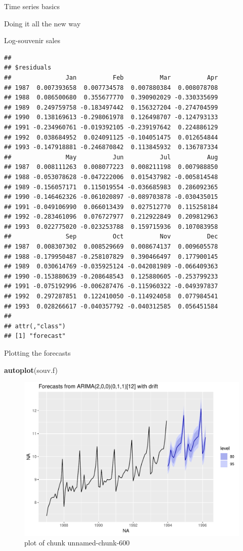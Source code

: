 \documentclass[ignorenonframetext,]{beamer}
\newenvironment{Shaded}{\begin{snugshade}}{\end{snugshade}}
\newcommand{\KeywordTok}[1]{\textcolor[rgb]{0.13,0.29,0.53}{\textbf{#1}}}
\newcommand{\NormalTok}[1]{#1}
\begin{document}
\begin{frame}[fragile]{Time series basics}
\begin{block}{Doing it all the new way}
\begin{block}{Log-souvenir sales}
\begin{verbatim}
## 
## $residuals
##               Jan          Feb          Mar          Apr
## 1987  0.007393658  0.007734578  0.007880384  0.008078708
## 1988  0.086500680  0.355677770  0.390902029 -0.330335699
## 1989  0.249759758 -0.183497442  0.156327204 -0.274704599
## 1990  0.138169613 -0.298061978  0.126498707 -0.124793133
## 1991 -0.234960761 -0.019392105 -0.239197642  0.224886129
## 1992  0.038684952  0.024091125 -0.104051475  0.012654844
## 1993 -0.147918881 -0.246870842  0.113845932  0.136787334
##               May          Jun          Jul          Aug
## 1987  0.008111263  0.008077223  0.008211198  0.007988850
## 1988 -0.053078628 -0.047222006  0.015437982 -0.005814548
## 1989 -0.156057171  0.115019554 -0.036685983  0.286092365
## 1990 -0.146462326 -0.061020897 -0.089703878 -0.030435015
## 1991 -0.049106990  0.066013439  0.027512770  0.115258184
## 1992 -0.283461096  0.076727977  0.212922849  0.209812963
## 1993  0.022775020 -0.023253788  0.159715936  0.107083958
##               Sep          Oct          Nov          Dec
## 1987  0.008307302  0.008529669  0.008674137  0.009605578
## 1988 -0.179950487 -0.258107829  0.390466497  0.177900145
## 1989  0.030614769 -0.035925124 -0.042081989 -0.066409363
## 1990 -0.153880639 -0.208648543  0.125880605 -0.253799233
## 1991 -0.075192996 -0.006287476 -0.115960322 -0.049397837
## 1992  0.297287851  0.122410050 -0.114924058  0.077984541
## 1993  0.028266617 -0.040357792 -0.040312585  0.056451584
## 
## attr(,"class")
## [1] "forecast"
\end{verbatim}

Plotting the forecasts

\begin{Shaded}
\begin{Highlighting}[]
\KeywordTok{autoplot}\NormalTok{(souv.f)}
\end{Highlighting}
\end{Shaded}

\begin{figure}
\centering
\includegraphics{figure/unnamed-chunk-600-1.pdf}
\caption{plot of chunk unnamed-chunk-600}
\end{figure}


\end{block}
\end{block}
\end{frame}
\end{document}
